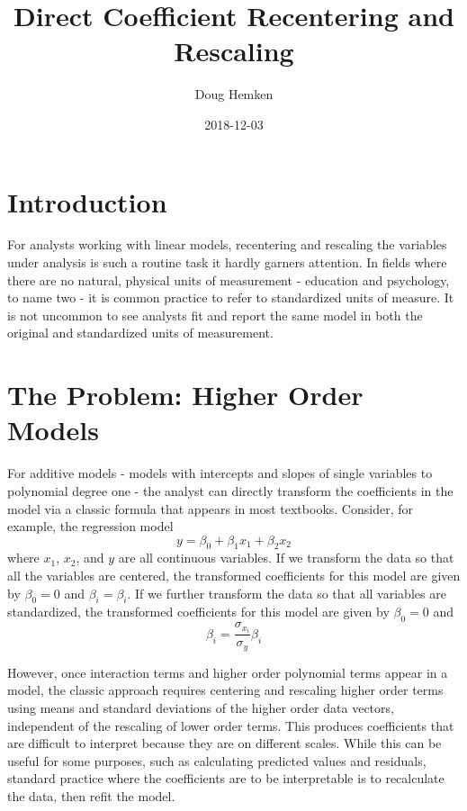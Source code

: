 \documentclass[]{article}
\title{Direct Coefficient Recentering and Rescaling}
\author{Doug Hemken}
\date{2018-12-03}
\begin{document}
\maketitle

{
\setcounter{tocdepth}{3}
\tableofcontents
}
\hypertarget{introduction}{%
\section{Introduction}\label{introduction}}

For analysts working with linear models, recentering and rescaling the
variables under analysis is such a routine task it hardly garners
attention. In fields where there are no natural, physical units of
measurement - education and psychology, to name two - it is common
practice to refer to standardized units of measure. It is not uncommon
to see analysts fit and report the same model in both the original and
standardized units of measurement.

\hypertarget{the-problem-higher-order-models}{%
\section{The Problem: Higher Order
Models}\label{the-problem-higher-order-models}}

For additive models - models with intercepts and slopes of single
variables to polynomial degree one - the analyst can directly transform
the coefficients in the model via a classic formula that appears in most
textbooks. Consider, for example, the regression model
\[y = \beta_0 + \beta_1x_1 + \beta_2x_2\] where \(x_1\), \(x_2\), and
\(y\) are all continuous variables. If we transform the data so that all
the variables are centered, the transformed coefficients for this model
are given by \(\beta_0=0\) and \(\beta_i=\beta_i\). If we further
transform the data so that all variables are standardized, the
transformed coefficients for this model are given by \(\beta_0=0\) and
\[\beta_i=\frac{\sigma_{x_i}}{\sigma_y}\beta_i\]

However, once interaction terms and higher order polynomial terms appear
in a model, the classic approach requires centering and rescaling higher
order terms using means and standard deviations of the higher order data
vectors, independent of the rescaling of lower order terms. This
produces coefficients that are difficult to interpret because they are
on different scales. While this can be useful for some purposes, such as
calculating predicted values and residuals, standard practice where the
coefficients are to be interpretable is to recalculate the data, then
refit the model.
\end{document}
